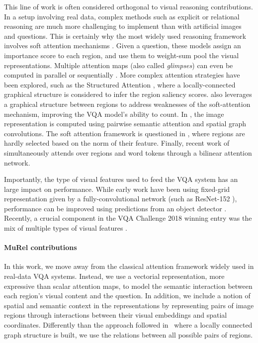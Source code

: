 \documentclass[10pt,twocolumn,letterpaper]{article}
\begin{document}
This line of work is often considered orthogonal to visual reasoning contributions. 
In a setup involving real data, complex methods such as explicit or relational reasoning are much more challenging to implement than with artificial images and questions.
This is certainly why the most widely used reasoning framework involves soft attention mechanisms \cite{bahdanau+al-2014-nmt, Xu:2015:SAT:3045118.3045336}. Given a question, these models assign an importance score to each region, and use them to weight-sum pool the visual representations. Multiple attention maps (also called \textit{glimpses}) can even be computed in parallel \cite{Kim2017,benyounescadene2017mutan,yu2017mfb,yu2018beyond} or sequentially \cite{YangHGDS16}. More complex attention strategies have been explored, such as the Structured Attention \cite{chen2017sva}, where a locally-connected graphical structure is considered to infer the region saliency scores. 
\cite{zhang2018learning} also leverages a graphical structure between regions to address weaknesses of the soft-attention mechanism, improving the VQA model's ability to count. 
In \cite{learningconditionedgraph}, the image representation is computed using pairwise semantic attention and spatial graph convolutions.
The soft attention framework is questioned in \cite{Malinowski_2018_ECCV}, where regions are hardly selected based on the norm of their feature. Finally, recent work of \cite{Kim2018} simultaneously attends over regions and word tokens through a bilinear attention network.

Importantly, the type of visual features used to feed the VQA system has an large impact on performance.
While early work have been using fixed-grid representation given by a fully-convolutional network (such as ResNet-152 \cite{DBLP:conf/cvpr/HeZRS16}), performance can be improved using predictions from an object detector \cite{Anderson_2018_CVPR}.
Recently, a crucial component in the VQA Challenge 2018 winning entry was the mix of multiple types of visual features \cite{pythia18arxiv}.

\paragraph{MuRel contributions}
In this work, we move away from the classical attention framework \cite{Kim2017, FukuiPYRDR16, benyounescadene2017mutan, yu2018beyond} widely used in real-data VQA systems. 
Instead, we use a vectorial representation, more expressive than scalar attention maps, to model the semantic interaction between each region's visual content and the question.
In addition, we include a notion of spatial and semantic context in the representations by representing pairs of image regions through interactions between their visual embeddings and spatial coordinates.
Differently than the approach followed in~\cite{learningconditionedgraph} where a locally connected graph structure is built, we use the relations between all possible pairs of regions.
\end{document}
